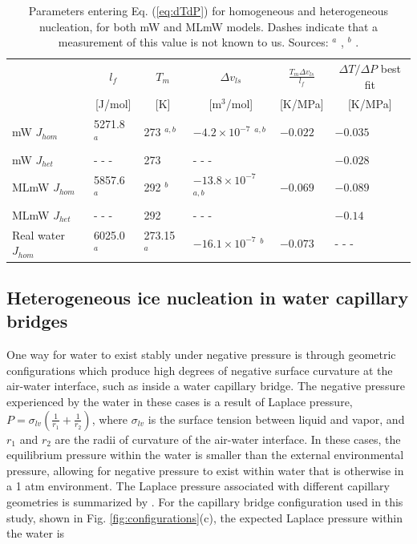 \documentclass[journal abbreviation, manuscript]{copernicus}
\begin{document}
\begin{table}
\begin{tabular}{ |p{2.60cm}||p{2.2cm}|p{2.2cm}|p{2.2cm}|p{2.2cm}|p{2.5cm}|  }
 \hline
 & \multicolumn{1}{|c|}{$l_f$}  
 & \multicolumn{1}{|c|}{$T_m$}
 & \multicolumn{1}{|c|}{$\Delta v_{ls}$}
 & \multicolumn{1}{|c|}{$\frac{T_m \Delta v_{ls}}{l_f}$ } 
 & \multicolumn{1}{|c|}{$\Delta T/ \Delta P$ best fit }\\
 & \multicolumn{1}{|c|}{[J/mol] }  
 & \multicolumn{1}{|c|}{[K] }
 & \multicolumn{1}{|c|}{[m$^3$/mol]  }        
 & \multicolumn{1}{|c|}{[K/MPa] }                           
 & \multicolumn{1}{|c|}{[K/MPa] }\\
 \hline
 mW $J_{hom}$   & 5271.8 $^a$           & 273 $^{a,b}$  &  $-4.2 \times 10^{-7}$ $^{a,b}$     & $-0.022$    & $-0.035$ \\
 mW $J_{het}$   & - - -   & 273           & - - -   &           & $-0.028$ \\
 MLmW $J_{hom}$ & 5857.6 $^a$           & 292 $^b$      & $-13.8 \times 10^{-7}$ $^{a,b}$     & $-0.069$    & $-0.089$ \\
 MLmW $J_{het}$ & - - -   & 292           & - - -   &           & $-0.14$ \\
 Real water $J_{hom}$ & 6025.0 $^a$     & 273.15 $^a$   & $-16.1 \times 10^{-7}$ $^{b}$       & $-0.073$    & - - - \\
 \hline
\end{tabular}
\caption{\label{tab:slopes} Parameters entering Eq. (\ref{eq:dTdP}) for homogeneous and heterogeneous nucleation, for both mW and MLmW models. Dashes indicate that a measurement of this value is not known to us. Sources: $^a$ \citet{chan2019}, $^b$ \citet{rosky2022}.}
\end{table}




\subsection{Heterogeneous ice nucleation in water capillary bridges} \label{capillary}

One way for water to exist stably under negative pressure is through geometric configurations which produce high degrees of negative surface curvature at the air-water interface, such as inside a water capillary bridge. The negative pressure experienced by the water in these cases is a result of Laplace pressure, $P = \sigma_{lv}(\frac{1}{r_1}+\frac{1}{r_2})$, where $\sigma_{lv}$ is the surface tension between liquid and vapor, and $r_1$ and $r_2$ are the radii of curvature of the air-water interface. In these cases, the equilibrium pressure within the water is smaller than the external environmental pressure, allowing for negative pressure to exist within water that is otherwise in a 1 atm environment. The Laplace pressure associated with different capillary geometries is summarized by \citet{elliott2021}. For the capillary bridge configuration used in this study, shown in Fig. \ref{fig:configurations}(c), the expected Laplace pressure within the water is
\end{document}
